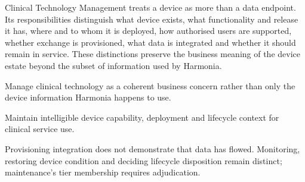 Clinical Technology Management treats a device as more than a data endpoint. Its responsibilities distinguish what device exists, what functionality and release it has, where and to whom it is deployed, how authorised users are supported, whether exchange is provisioned, what data is integrated and whether it should remain in service. These distinctions preserve the business meaning of the device estate beyond the subset of information used by Harmonia.



Manage clinical technology as a coherent business concern rather than only the device information Harmonia happens to use.



Maintain intelligible device capability, deployment and lifecycle context for clinical service use.



Provisioning integration does not demonstrate that data has flowed. Monitoring, restoring device condition and deciding lifecycle disposition remain distinct; maintenance's tier membership requires adjudication.


